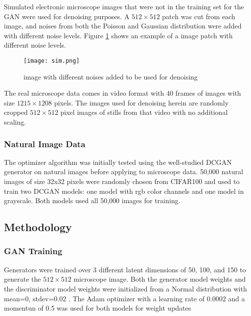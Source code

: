 \documentclass{article}
\begin{document}
Simulated electronic microscope images that were not in the training set for the GAN were used for denoising purposes. A $512\times 512$ patch was cut from each image, and noises from both the Poisson and Gaussian distribution were added with different noise levels. Figure \ref{fig:sim} shows an example of a image patch with different noise levels.
\begin{figure}[!h]
    \centering
    \texttt{[image: sim.png]}
    \caption{image with different noises added to be used for denoising}
    \label{fig:sim}
\end{figure}
\FloatBarrier

The real microscope data comes in video format with 40 frames of images with size $1215\times1208$ pixels. The images used for denoising herein are randomly cropped $512\times512$ pixel images of stills from that video with no additional scaling. 

\subsubsection{Natural Image Data}
The optimizer algorithm was initially tested using the well-studied DCGAN generator on natural images before applying to microscope data. 50,000 natural images of size 32x32 pixels were randomly chosen from CIFAR100 \cite{cifar100} and used to train two DCGAN models: one model with rgb color channels and one model in grayscale. Both models used all 50,000 images for training.

\subsection{Methodology} 

\subsubsection{GAN Training}
Generators were trained over 3 different latent dimensions of 50, 100, and 150 to generate the $512\times 512$ microscope image.
Both the generator model weights and the discriminator model weights were initialized from a Normal distribution with mean=0, stdev=0.02 \cite{DCGAN}. The Adam optimizer \cite{adam} with a learning rate of 0.0002 and a momentun of 0.5 was used for both models for weight updates
\end{document}
